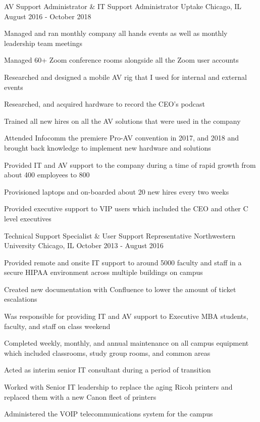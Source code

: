 \begin{cventries}
	\cventry
	{AV Support Administrator \& IT Support Administrator} %
	{Uptake} %
	{Chicago, IL} %
	{August 2016 - October 2018} %
	{
		\begin{cvitems} %
			\item {Managed and ran monthly company all hands events as well as monthly leadership team meetings}
			\item {Managed 60+ Zoom conference rooms alongside all the Zoom user accounts}
			\item {Researched and designed a mobile AV rig that I used for internal and external events}
			\item {Researched, and acquired hardware to record the CEO's podcast}
			\item {Trained all new hires on all the AV solutions that were used in the company}
			\item {Attended Infocomm the premiere Pro-AV convention in 2017, and 2018 and brought back knowledge to implement new hardware and solutions}
			\item {Provided IT and AV support to the company during a time of rapid growth from about 400 employees to 800}
			\item {Provisioned laptops and on-boarded about 20 new hires every two weeks}
			\item {Provided executive support to VIP users which included the CEO and other C level executives}
		\end{cvitems}
	}

	\cventry
	{Technical Support Specialist \& User Support Representative} %
	{Northwestern University} %
	{Chicago, IL} %
	{October 2013 - August 2016} %
	{
		\begin{cvitems} %
			\item {Provided remote and onsite IT support to around 5000 faculty and staff in a secure HIPAA environment across multiple buildings on campus}
			\item {Created new documentation with Confluence to lower the amount of ticket escalations}
			\item {Was responsible for providing IT and AV support to Executive MBA students, faculty, and staff on class weekend}
			\item {Completed weekly, monthly, and annual maintenance on all campus equipment which included classrooms, study group rooms, and common areas}
			\item {Acted as interim senior IT consultant during a period of transition}
			\item {Worked with Senior IT leadership to replace the aging Ricoh printers and replaced them with a new Canon fleet of printers}
			\item {Administered the VOIP telecommunications system for the campus}
		\end{cvitems}
	}

\end{cventries}
